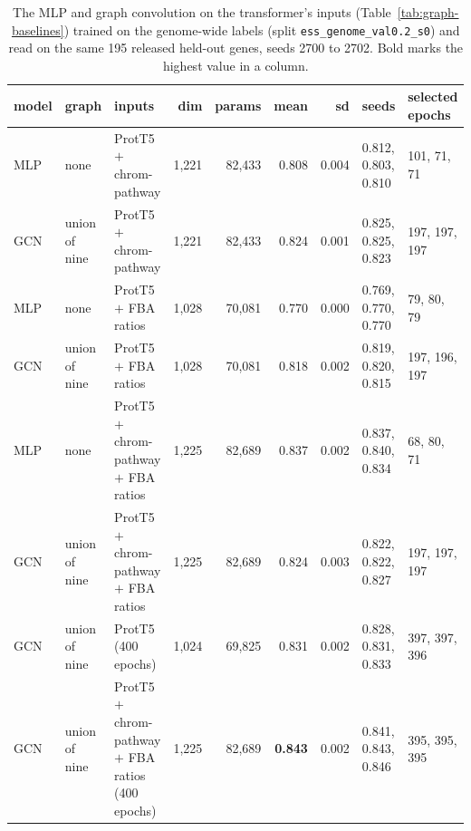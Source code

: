 \begin{table}[H]
  \centering
  \scriptsize
  \setlength{\tabcolsep}{3pt}
  \caption[Cheap models on the three inputs trained on the genome-wide labels]{The MLP and graph convolution on the transformer's inputs (Table~\ref{tab:graph-baselines}) trained on the genome-wide labels (split \texttt{ess\_genome\_val0.2\_s0}) and read on the same 195 released held-out genes, seeds 2700 to 2702. Bold marks the highest value in a column.}
  \label{tab:graph-extra-genome}
  \begin{tabular}{@{}lllrrrrll@{}}
    \hline
    model & graph & inputs & dim & params & mean & sd & seeds & selected epochs \\
    \hline
    MLP & none & ProtT5 $+$ chrom-pathway & 1,221 & 82,433 & 0.808 & 0.004 & 0.812, 0.803, 0.810 & 101, 71, 71 \\
    GCN & union of nine & ProtT5 $+$ chrom-pathway & 1,221 & 82,433 & 0.824 & 0.001 & 0.825, 0.825, 0.823 & 197, 197, 197 \\
    MLP & none & ProtT5 $+$ FBA ratios & 1,028 & 70,081 & 0.770 & 0.000 & 0.769, 0.770, 0.770 & 79, 80, 79 \\
    GCN & union of nine & ProtT5 $+$ FBA ratios & 1,028 & 70,081 & 0.818 & 0.002 & 0.819, 0.820, 0.815 & 197, 196, 197 \\
    MLP & none & ProtT5 $+$ chrom-pathway $+$ FBA ratios & 1,225 & 82,689 & 0.837 & 0.002 & 0.837, 0.840, 0.834 & 68, 80, 71 \\
    GCN & union of nine & ProtT5 $+$ chrom-pathway $+$ FBA ratios & 1,225 & 82,689 & 0.824 & 0.003 & 0.822, 0.822, 0.827 & 197, 197, 197 \\
    GCN & union of nine & ProtT5 (400 epochs) & 1,024 & 69,825 & 0.831 & 0.002 & 0.828, 0.831, 0.833 & 397, 397, 396 \\
    GCN & union of nine & ProtT5 $+$ chrom-pathway $+$ FBA ratios (400 epochs) & 1,225 & 82,689 & \textbf{0.843} & 0.002 & 0.841, 0.843, 0.846 & 395, 395, 395 \\
    \hline
  \end{tabular}
\end{table}
